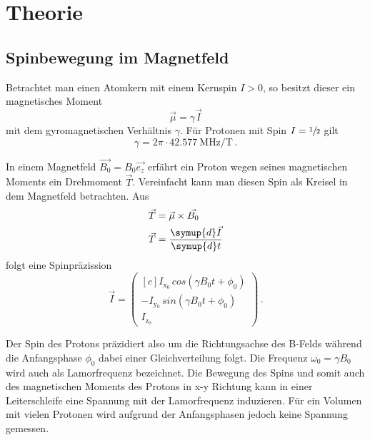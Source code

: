 \section{Theorie}

\subsection{Spinbewegung im Magnetfeld}

Betrachtet man einen Atomkern mit einem Kernspin $I>0$, so besitzt dieser ein magnetisches Moment
\begin{equation*}
  \vec{\mu} = \gamma \vec{I}
\end{equation*}
mit dem gyromagnetischen Verhältnis $\gamma$.
Für Protonen mit Spin $I = \sfrac{1}{2}$ gilt
\begin{equation*}
  \gamma = 2 \pi \cdot \SI{42.577}{\mega\hertz\per\tesla}\,. %
\end{equation*}

In einem Magnetfeld $\vec{B_0} = B_0 \vec{e_z}$ erfährt ein Proton wegen seines magnetischen Moments ein Drehmoment $\vec{T}$.
Vereinfacht kann man diesen Spin als Kreisel in dem Magnetfeld betrachten.
Aus
\begin{align*}
  \vec{T} &= \vec{\mu} \times \vec{B_0}  \\
  \vec{T} &= \frac{\symup{d}\vec{I}}{\symup{d}t}
\end{align*}
folgt eine Spinpräzission
\begin{equation}
  \vec{I} =
  \begin{pmatrix*}[c]
    I_{\text{x$_0$}} \, cos(\gamma B_0 t + \phi_0) \\
    -I_{\text{y$_0$}} \, sin(\gamma B_0 t + \phi_0) \\
    I_{\text{z$_0$}}
\end{pmatrix*}
 \, .
\end{equation}

Der Spin des Protons präzidiert also um die Richtungsachse des B-Felds während die Anfangsphase $\phi_0$ dabei einer Gleichverteilung folgt.
Die Frequenz $\omega_0 = \gamma B_0$ wird auch als Lamorfrequenz bezeichnet.
Die Bewegung des Spins und somit auch des magnetischen Moments des Protons in x-y Richtung kann in einer Leiterschleife eine Spannung mit der Lamorfrequenz induzieren.
Für ein Volumen mit vielen Protonen wird aufgrund der Anfangsphasen jedoch keine Spannung gemessen.


